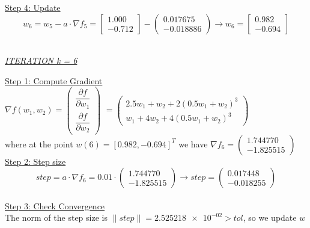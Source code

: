\underline{Step 4: Update}
\[ 
w_6 = w_5 - a\cdot \nabla f_5 =  \left[\begin{array}{c}
	1.000\\
	-0.712
\end{array}\right] - \left(\begin{array}{c}
0.017675 \\
-0.018886
\end{array}\right) \rightarrow
w_6 = \left[\begin{array}{c}
	0.982\\
	-0.694
\end{array}\right]
\]
\\[4mm]

\begin{center}
	\underline{\textit{ITERATION k = 6}}
\end{center}

\underline{Step 1: Compute Gradient}\\
\(\nabla f(w_1,w_2) = \left(\begin{array}{c}
	\dfrac{\partial f}{\partial w_1} \\[4mm]
	\dfrac{\partial f}{\partial w_2}
\end{array}\right)\) $= \left(\begin{array}{c}
	2.5w_1 + w_2 + 2(0.5w_1+w_2)^3\\[1mm]
	w_1 + 4w_2 + 4(0.5w_1+w_2)^3
\end{array}\right)$ \\[3mm]

where at the point $w\left(6\right) = \left[0.982, -0.694\right]^T$ we have $\nabla f_{6} = \left(\begin{array}{c}
	1.744770 \\
	-1.825515
\end{array}\right)$
\\[4mm]

\underline{Step 2: Step size}
\[
step = a \cdot \nabla f_{6} = 0.01 \cdot \left(\begin{array}{c}
	1.744770 \\
   -1.825515
\end{array}\right) \rightarrow step =\left(\begin{array}{c}
0.017448 \\
-0.018255
\end{array}\right)
\]
\\[4mm]

\underline{Step 3: Check Convergence}\\
The norm of the step size is $\| step \| = \num{2.525218e-02} > tol$, so we update $w$
\\[4mm]

